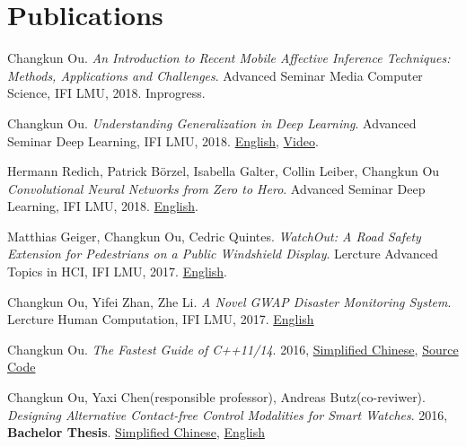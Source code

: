 \section{\textbf{Publications}}
 \resumeSubHeadingListStart
    \item{
      Changkun Ou.
      \emph{An Introduction to Recent Mobile Affective Inference Techniques: Methods, Applications and Challenges}.
      Advanced Seminar Media Computer Science, IFI LMU, 2018. Inprogress.
    }
    \item{
      Changkun Ou.
      \emph{Understanding Generalization in Deep Learning}.
      Advanced Seminar Deep Learning, IFI LMU, 2018. \href{https://docs.google.com/presentation/d/1eNUYH9_3bbBO7bONPU8BCTr2DOMC69gdOJvBgpLjwNg/edit#slide=id.g2cdf1dbd0b_1_6}{English}, \href{https://www.youtube.com/watch?v=z9je5YlnBgI&t=1585s}{Video}.
    }   
    \item{
      Hermann Redich, Patrick Börzel, Isabella Galter, Collin Leiber, Changkun Ou
      \emph{Convolutional Neural Networks from Zero to Hero}.
      Advanced Seminar Deep Learning, IFI LMU, 2018. \href{https://github.com/changkun/talks/blob/master/201712/cnn.pdf}{English}.
    }
    \item{
        Matthias Geiger, Changkun Ou, Cedric Quintes.
        \emph{WatchOut: A Road Safety Extension for Pedestrians on a Public Windshield Display}.
        Lercture Advanced Topics in HCI, IFI LMU, 2017. \href{https://github.com/changkun/ath-windshild-display/blob/master/paper/ath.pdf}{English}.
    }
    \item{
      Changkun Ou, Yifei Zhan, Zhe Li.
      \emph{A Novel GWAP Disaster Monitoring System}.
      Lercture Human Computation, IFI LMU, 2017.
      \href{https://github.com/changkun/hc-ss17-disaster-monitoring/blob/master/report/hc_final_project_report_team_Hotpot.pdf}{English}
    }
   \item{
       Changkun Ou.
       \emph{The Fastest Guide of C++11/14}. 
       2016, 
       \href{https://www.gitbook.com/book/changkun/cpp1x-tutorial/details}{Simplified Chinese}, 
       \href{https://github.com/changkun/cpp1x-tutorial}{Source Code}
   }
   \item{
       Changkun Ou, Yaxi Chen(responsible professor), Andreas Butz(co-reviwer).
       \emph{Designing Alternative Contact-free Control Modalities for Smart Watches}. 
       2016, \textbf{Bachelor Thesis}. \href{https://changkun.us/files/cv/bachelor-thesis-cn.html}{Simplified Chinese}, 
       \href{https://changkun.us/files/cv/bachelor-thesis-en.html}{English}
   }
